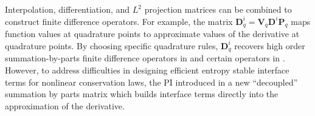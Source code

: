 \documentclass[review]{siamart0216}
\theoremstyle{assumption}
\begin{document}
Interpolation, differentiation, and $L^2$ projection matrices can be combined to construct finite difference operators.  For example, the matrix $\bm{D}^i_q = \bm{V}_q\bm{D}^i\bm{P}_q$ maps function values at quadrature points to approximate values of the derivative at quadrature points.  By choosing specific quadrature rules, $\bm{D}^i_q$ recovers high order summation-by-parts finite difference operators in \cite{gassner2013skew, fernandez2014generalized, ranocha2018generalised} and certain operators in \cite{hicken2016multidimensional}.  However, to address difficulties in designing efficient entropy stable interface terms for nonlinear conservation laws, the PI introduced in \cite{chan2017discretely} a new ``decoupled'' summation by parts matrix which builds interface terms directly into the approximation of the derivative.  
\end{document}
